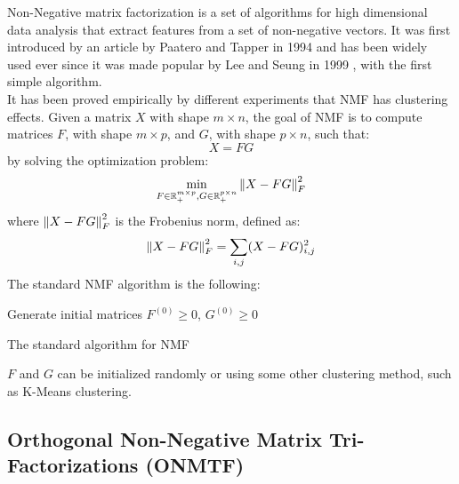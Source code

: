Non-Negative matrix factorization is a set of algorithms for high dimensional data analysis that extract features from a set of non-negative vectors. It was first introduced by an article by Paatero and Tapper in 1994 \cite{10.1002/env.3170050203} and has been widely used ever since it was made popular by Lee and Seung in 1999 \cite{10.1038/44565}, with the first simple algorithm.\\
It has been proved empirically by different experiments \cite{10.5555/1005332.1044709, 10.1109/CVPR.2001.990477} that NMF has clustering effects.
Given a matrix $X$ with shape $m \times n$, the goal of NMF is to compute matrices $F$, with shape $m \times p$, and $G$, with shape $p \times n$, such that:
\begin{equation*}
X = FG
\end{equation*}
by solving the optimization problem:
\begin{equation*}
\min_{F \in \mathbb{R}^{m \times p}_+, G \in \mathbb{R}^{p \times n}_+} \left\lVert X - FG\right\rVert_F^2
\end{equation*}
where $\left\lVert X - FG\right\rVert_F^2$ is the Frobenius norm, defined as:
\begin{equation*}
\left\lVert X - FG\right\rVert_F^2 = \sum_{i,j} (X - FG)_{i,j}^2
\end{equation*}
The standard NMF algorithm is the following:
\vskip 0.7cm
\begin{algorithm}[H]
Generate initial matrices $F^{(0)} \geq 0$, $G^{(0)} \geq 0$\;
\caption{The standard algorithm for NMF}
\end{algorithm}
\vskip 0.7cm
$F$ and $G$ can be initialized randomly or using some other clustering method, such as K-Means clustering.


\subsection{Orthogonal Non-Negative Matrix Tri-Factorizations (ONMTF)}

